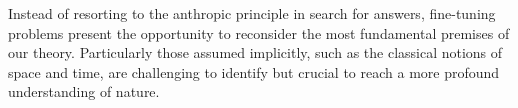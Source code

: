 Instead of resorting to the anthropic principle in search for answers, fine-tuning problems present the opportunity to reconsider the most fundamental premises of our theory. Particularly those assumed implicitly, such as the classical notions of space and time, are challenging to identify but crucial to reach a more profound understanding of nature.
